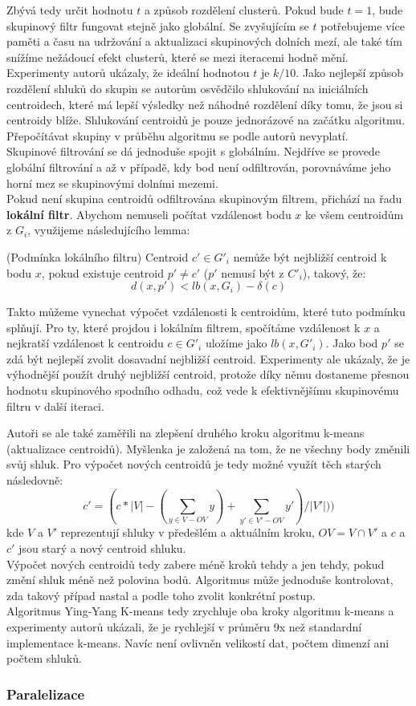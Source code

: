 Zbývá tedy určit hodnotu $t$ a způsob rozdělení clusterů. Pokud bude $t=1$, bude skupinový filtr fungovat stejně jako globální. Se zvyšujícím se $t$ potřebujeme více paměti a času na udržování a aktualizaci skupinových dolních mezí, ale také tím snížíme nežádoucí efekt clusterů, které se mezi iteracemi hodně mění. Experimenty autorů ukázaly, že ideální hodnotou $t$ je $k/10$. Jako nejlepší způsob rozdělení shluků do skupin se autorům osvědčilo shlukování na iniciálních centroidech, které má lepší výsledky než náhodné rozdělení díky tomu, že jsou si centroidy blíže. Shlukování centroidů je pouze jednorázové na začátku algoritmu. Přepočítávat skupiny v průběhu algoritmu se podle autorů nevyplatí.\\

Skupinové filtrování se dá jednoduše spojit s globálním. Nejdříve se provede globální filtrování a až v případě, kdy bod není odfiltrován, porovnáváme jeho horní mez se skupinovými dolními mezemi.\\

Pokud není skupina centroidů odfiltrována skupinovým filtrem, přichází na řadu \textbf{lokální filtr}. Abychom nemuseli počítat vzdálenost bodu $x$ ke všem centroidům z $G_i$, využijeme následujícího lemma:
\begin{lemma}
(Podmínka lokálního filtru) Centroid $c' \in G'_i$ nemůže být nejbližší centroid k bodu $x$, pokud existuje centroid $p' \ne c'$ ($p'$ nemusí být z $C'_i$), takový, že:
$$d(x,p') < lb(x, G_i)-\delta(c)$$
\end{lemma}
Takto můžeme vynechat výpočet vzdálenosti k centroidům, které tuto podmínku splňují. Pro ty, které projdou i lokálním filtrem, spočítáme vzdálenost k $x$ a nejkratší vzdálenost k centroidu $c \in G'_i$ uložíme jako $lb(x,G'_i)$. Jako bod $p'$ se zdá být nejlepší zvolit dosavadní nejbližší centroid. Experimenty ale ukázaly, že je výhodnější použít druhý nejbližší centroid, protože díky němu dostaneme přesnou hodnotu skupinového spodního odhadu, což vede k efektivnějšímu skupinovému filtru v další iteraci.

Autoři se ale také zaměřili na zlepšení druhého kroku algoritmu k-means (aktualizace centroidů). Myšlenka je založená na tom, že ne všechny body změnili svůj shluk. Pro výpočet nových centroidů je tedy možné využít těch starých následovně:
$$c' = (c \ast |V| -(\sum\limits_{y\in V-OV}y) + \sum\limits_{y'\in V'-OV}y')/|V'|))$$
kde $V$ a $V'$ reprezentují shluky v předešlém a aktuálním kroku, $OV = V\cap V'$ a $c$ a $c'$ jsou starý a nový centroid shluku.\\

Výpočet nových centroidů tedy zabere méně kroků tehdy a jen tehdy, pokud změní shluk méně než polovina bodů. Algoritmus může jednoduše kontrolovat, zda takový případ nastal a podle toho zvolit konkrétní postup.\\

Algoritmus Ying-Yang K-means tedy zrychluje oba kroky algoritmu k-means a experimenty autorů ukázali, že je rychlejší v průměru 9x než standardní implementace k-means. Navíc není ovlivněn velikostí dat, počtem dimenzí ani počtem shluků.
\subsubsection{Paralelizace}

